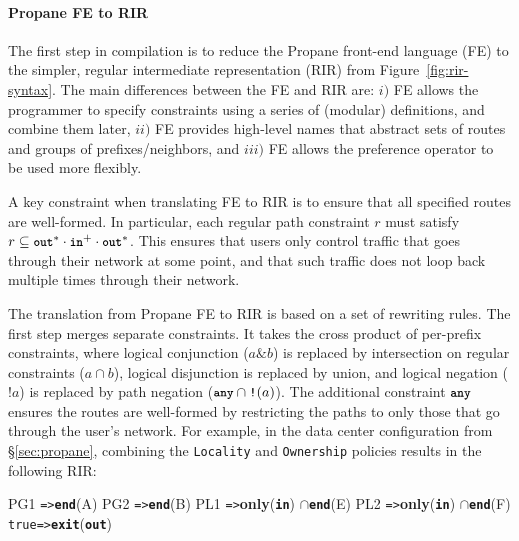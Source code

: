 \documentclass[10pt]{sigalternate052015}
\newcommand{\sysname}{{\small \sf Propane}\xspace}
\newcommand{\para}[1]{\paragraph*{\textbf{#1}}}
\newcommand{\CD}[1]{\texttt{\small #1}}  %
\newcommand{\KW}[1]{\texttt{\small\bfseries{#1}}}
\newcommand{\True}{\CD{true}}
\newcommand{\Path}{\texttt{=>}}
\newcommand{\Any}{\KW{any}}
\newcommand{\In}{\KW{in}}
\newcommand{\Out}{\KW{out}}
\newcommand{\AND}{\texttt{\&}}
\newcommand{\NOT}{\texttt{!}}
\newcommand{\Intersect}{\ensuremath{\cap}}
\newcommand{\Exit}{\KW{exit}}
\newcommand{\End}{\KW{end}}
\renewcommand{\path}[2]{ #1 \mapsto \ensuremath{#2} }
\begin{document}
\para{Propane FE to RIR}

The first step in compilation is to reduce the \sysname front-end language (FE) to the simpler, regular intermediate representation (RIR) from Figure~\ref{fig:rir-syntax}.
The main differences between the FE and RIR are: $i)$ FE allows the programmer to specify constraints using a series of (modular) definitions, and combine them later, $ii)$ FE provides high-level names that abstract sets of routes and groups of prefixes/neighbors, and $iii)$ FE allows the preference operator to be used more flexibly.

A key constraint when translating FE to RIR is to ensure that all specified routes are well-formed. In particular, each regular path constraint $r$ must satisfy $r \subseteq \Out^* \cdot \In^+ \cdot \Out^*$. This ensures that users only control traffic that goes through their network at some point, and that such traffic does not loop back multiple times through their network.

The translation from \sysname FE to RIR is based on a set of rewriting rules.
The first step merges separate constraints. It takes the cross product of per-prefix constraints, where logical conjunction ($a \AND b$) is replaced by intersection on regular constraints ($a \Intersect b$), logical disjunction is replaced by union, and logical negation ($\NOT a$) is replaced by path negation ($\Any \cap \NOT(a)$). The additional constraint $\Any$ ensures the routes are well-formed by restricting the paths to only those that go through the user's network.
%
For example, in the data center configuration from \S\ref{sec:propane}, combining the \CD{Locality} and \CD{Ownership} policies results in the following RIR:


\begin{code}
PG1 \Path \End(A)
PG2 \Path \End(B)
PL1 \Path \textbf{only}(\In) \Intersect \End(E)
PL2 \Path \textbf{only}(\In) \Intersect \End(F)
\True \Path \Exit(\Out)
\end{code}
\end{document}
